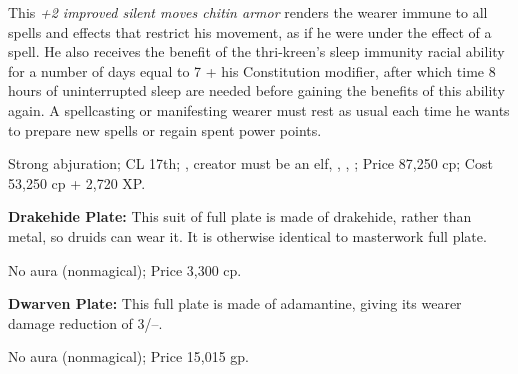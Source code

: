 This \emph{+2 improved silent moves chitin armor} renders the wearer immune to all spells and effects that restrict his movement, as if he were under the effect of a  spell. He also receives the benefit of the thri-kreen's sleep immunity racial ability for a number of days equal to 7 + his Constitution modifier, after which time 8 hours of uninterrupted sleep are needed before gaining the benefits of this ability again. A spellcasting or manifesting wearer must rest as usual each time he wants to prepare new spells or regain spent power points.

Strong abjuration; CL 17th; , creator must be an elf, , , ; Price 87,250 cp; Cost 53,250 cp + 2,720 XP.

\textbf{Drakehide Plate:} This suit of full plate is made of drakehide, rather than metal, so druids can wear it. It is otherwise identical to masterwork full plate.

No aura (nonmagical); Price 3,300 cp.

\textbf{Dwarven Plate:} This full plate is made of adamantine, giving its wearer damage reduction of 3/--.

No aura (nonmagical); Price 15,015 gp.